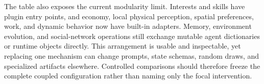The table also exposes the current modularity limit.  Interests and skills have
plugin entry points, and economy, local physical perception, spatial
preferences, work, and dynamic behavior now have built-in adapters.  Memory,
environment evolution, and social-network operations still exchange mutable
agent dictionaries or runtime objects directly.  This arrangement is usable
and inspectable, yet replacing
one mechanism can change prompts, state schemas, random draws, and specialized
artifacts elsewhere.  Controlled comparisons should therefore freeze the
complete coupled configuration rather than naming only the focal intervention.
